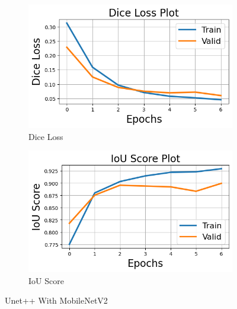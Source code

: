 \documentclass[12pt]{article}
\begin{document}
\begin{figure}[H]
  \begin{subfigure}[b]{0.5\textwidth}
    \includegraphics[width=\textwidth]{Figs/unet++withmbnetdice.png}
    \caption{Dice Loss}
    \label{fig:f1}
  \end{subfigure}
  \hfill
  \begin{subfigure}[b]{0.5\textwidth}
    \includegraphics[width=\textwidth]{Figs/unet++withmbnetiou.png}
    \caption{IoU Score}
    \label{fig:f2}
  \end{subfigure}
  \caption{Unet++ With MobileNetV2}
\end{figure}
\end{document}
